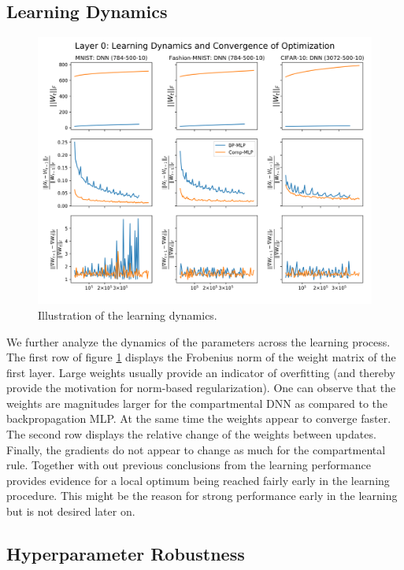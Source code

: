\documentclass[colorinlistoftodos]{article}
\theoremstyle{definition}
\begin{document}
\subsection*{Learning Dynamics}

\begin{figure}[H]
	\centering
	\includegraphics[width=\textwidth]{../figures/dynamics_l0}
	\caption{Illustration of the learning dynamics.}\label{fig:dynamics}
\end{figure}

We further analyze the dynamics of the parameters across the learning process. The first row of figure \ref{fig:dynamics} displays the Frobenius norm of the weight matrix of the first layer. Large weights usually provide an indicator of overfitting (and thereby provide the motivation for norm-based regularization). One can observe that the weights are magnitudes larger for the compartmental DNN as compared to the backpropagation MLP. At the same time the weights appear to converge faster. The second row displays the relative change of the weights between updates. Finally, the gradients do not appear to change as much for the compartmental rule.
Together with out previous conclusions from the learning performance provides evidence for a local optimum being reached fairly early in the learning procedure. This might be the reason for strong performance early in the learning but is not desired later on.

\subsection*{Hyperparameter Robustness}
\end{document}
